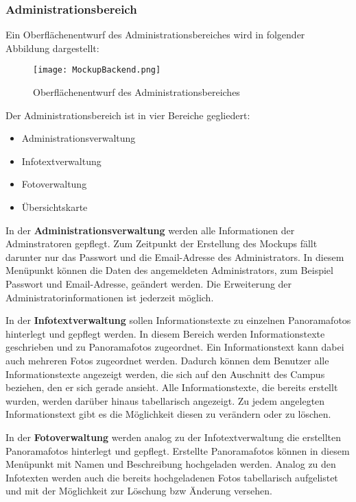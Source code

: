 \subsubsection{Administrationsbereich}
\label{sec:Administrationsbereich}

Ein Oberflächenentwurf des Administrationsbereiches wird in folgender Abbildung dargestellt:

\begin{figure}[htb]
\centering
\texttt{[image: MockupBackend.png]}
\caption[Mockup Backend]{Oberflächenentwurf des
Administrationsbereiches\protect\footnotemark}
\label{fig:MockupBackend}
\end{figure}

Der Administrationsbereich ist in vier Bereiche gegliedert:

\begin{itemize}
  \item Administrationsverwaltung
  \item Infotextverwaltung
  \item Fotoverwaltung
  \item Übersichtskarte
\end{itemize}

In der \textbf{Administrationsverwaltung} werden alle Informationen der Adminstratoren gepflegt. Zum Zeitpunkt der Erstellung des Mockups fällt darunter nur das Passwort und die Email-Adresse des Administrators. In diesem Menüpunkt können die Daten des angemeldeten Administrators, zum Beispiel Passwort und Email-Adresse, geändert werden. Die Erweiterung der Administratorinformationen ist jederzeit möglich.

In der \textbf{Infotextverwaltung} sollen Informationstexte zu einzelnen Panoramafotos hinterlegt und gepflegt werden. In diesem Bereich werden Informationstexte geschrieben und zu Panoramafotos zugeordnet. Ein Informationstext kann dabei auch mehreren Fotos zugeordnet werden. Dadurch können dem Benutzer alle Informationstexte angezeigt werden, die sich auf den Auschnitt des Campus beziehen, den er sich gerade ansieht. Alle Informationstexte, die bereits erstellt wurden, werden darüber hinaus tabellarisch angezeigt. Zu jedem angelegten Informationstext gibt es die Möglichkeit diesen zu verändern oder zu löschen.

In der \textbf{Fotoverwaltung} werden analog zu der Infotextverwaltung die erstellten Panoramafotos hinterlegt und gepflegt. Erstellte Panoramafotos können in diesem Menüpunkt mit Namen und Beschreibung hochgeladen werden. Analog zu den Infotexten werden auch die bereits hochgeladenen Fotos tabellarisch aufgelistet und mit der Möglichkeit zur Löschung bzw Änderung versehen.

